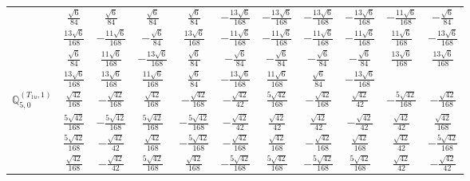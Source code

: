 \documentclass[fleqn,10pt,landscape]{article}
\begin{document}
\begin{itemize}
{\begin{center}
\begin{longtable}{ccccccccccc}
& $ \frac{\sqrt{6}}{84} $ & $ \frac{\sqrt{6}}{84} $ & $ \frac{\sqrt{6}}{84} $ & $ \frac{\sqrt{6}}{84} $ & $ - \frac{13 \sqrt{6}}{168} $ & $ - \frac{13 \sqrt{6}}{168} $ & $ - \frac{13 \sqrt{6}}{168} $ & $ - \frac{13 \sqrt{6}}{168} $ & $ - \frac{11 \sqrt{6}}{168} $ & $ - \frac{\sqrt{6}}{84} $ \\
& $ \frac{13 \sqrt{6}}{168} $ & $ - \frac{11 \sqrt{6}}{168} $ & $ - \frac{\sqrt{6}}{84} $ & $ \frac{13 \sqrt{6}}{168} $ & $ - \frac{11 \sqrt{6}}{168} $ & $ - \frac{11 \sqrt{6}}{168} $ & $ - \frac{11 \sqrt{6}}{168} $ & $ - \frac{11 \sqrt{6}}{168} $ & $ \frac{11 \sqrt{6}}{168} $ & $ - \frac{13 \sqrt{6}}{168} $ \\
& $ \frac{\sqrt{6}}{84} $ & $ \frac{11 \sqrt{6}}{168} $ & $ - \frac{13 \sqrt{6}}{168} $ & $ \frac{\sqrt{6}}{84} $ & $ - \frac{\sqrt{6}}{84} $ & $ - \frac{\sqrt{6}}{84} $ & $ - \frac{\sqrt{6}}{84} $ & $ - \frac{\sqrt{6}}{84} $ & $ \frac{13 \sqrt{6}}{168} $ & $ \frac{13 \sqrt{6}}{168} $ \\
& $ \frac{13 \sqrt{6}}{168} $ & $ \frac{13 \sqrt{6}}{168} $ & $ \frac{11 \sqrt{6}}{168} $ & $ \frac{\sqrt{6}}{84} $ & $ - \frac{13 \sqrt{6}}{168} $ & $ \frac{11 \sqrt{6}}{168} $ & $ \frac{\sqrt{6}}{84} $ & $ - \frac{13 \sqrt{6}}{168} $ & $  $ & $  $ \\ \hline
$\mathbb{Q}_{5,0}^{(T_{1u},1)}$ & $ \frac{\sqrt{42}}{168} $ & $ - \frac{\sqrt{42}}{168} $ & $ \frac{\sqrt{42}}{168} $ & $ - \frac{\sqrt{42}}{168} $ & $ - \frac{\sqrt{42}}{42} $ & $ \frac{5 \sqrt{42}}{168} $ & $ - \frac{\sqrt{42}}{168} $ & $ \frac{\sqrt{42}}{42} $ & $ - \frac{5 \sqrt{42}}{168} $ & $ - \frac{\sqrt{42}}{168} $ \\
& $ \frac{5 \sqrt{42}}{168} $ & $ - \frac{5 \sqrt{42}}{168} $ & $ \frac{5 \sqrt{42}}{168} $ & $ - \frac{5 \sqrt{42}}{168} $ & $ - \frac{\sqrt{42}}{42} $ & $ \frac{\sqrt{42}}{42} $ & $ \frac{\sqrt{42}}{42} $ & $ - \frac{\sqrt{42}}{42} $ & $ \frac{\sqrt{42}}{42} $ & $ \frac{\sqrt{42}}{168} $ \\
& $ \frac{5 \sqrt{42}}{168} $ & $ - \frac{\sqrt{42}}{42} $ & $ \frac{\sqrt{42}}{168} $ & $ - \frac{5 \sqrt{42}}{168} $ & $ - \frac{\sqrt{42}}{168} $ & $ \frac{\sqrt{42}}{168} $ & $ - \frac{\sqrt{42}}{168} $ & $ \frac{\sqrt{42}}{168} $ & $ \frac{\sqrt{42}}{42} $ & $ - \frac{5 \sqrt{42}}{168} $ \\
& $ \frac{\sqrt{42}}{168} $ & $ - \frac{\sqrt{42}}{42} $ & $ \frac{5 \sqrt{42}}{168} $ & $ \frac{\sqrt{42}}{168} $ & $ - \frac{5 \sqrt{42}}{168} $ & $ \frac{5 \sqrt{42}}{168} $ & $ - \frac{5 \sqrt{42}}{168} $ & $ \frac{5 \sqrt{42}}{168} $ & $ \frac{\sqrt{42}}{42} $ & $ - \frac{\sqrt{42}}{42} $ \\

\end{longtable}
\end{center}}
\end{itemize}
\end{document}
